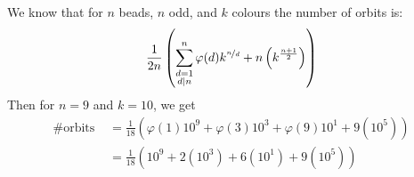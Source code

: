 \documentclass[12pt, answers]{exam}
\begin{document}
\begin{questions}
        \begin{solution}
            We know that for $n$ beads, $n$ odd, and $k$ colours the number of orbits is:
            \[ \frac{1}{2n}\left(\sum_{\substack{d = 1 \\ d \mathrel{|} n}}^n \varphi(d)k^{\nicefrac{n}{d}} + n\left(k^{\frac{n+1}{2}}\right)\right) \]
            Then for $n = 9$ and $k = 10$, we get
            \begin{align*}
                \#\text{orbits } &= \frac{1}{18}\left(\varphi(1)10^9 + \varphi(3)10^3 + \varphi(9)10^1 + 9\left(10^{5}\right)\right) \\
                &= \frac{1}{18}\left(10^9 + 2\left(10^3\right) + 6\left(10^1\right) + 9\left(10^{5}\right)\right)
            \end{align*}
        \end{solution}


    \end{questions}
\end{document}
